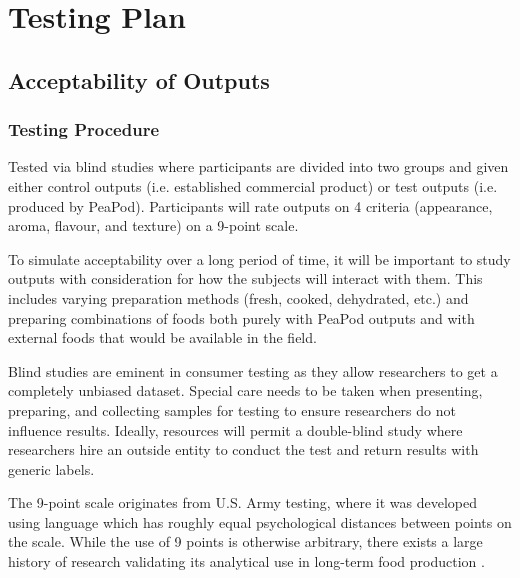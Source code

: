 \section{Testing Plan}

\subsection{Acceptability of Outputs}

\subsubsection{Testing Procedure}
Tested via blind studies where participants are divided into two groups and given either control outputs (i.e. established commercial product) or test outputs (i.e. produced by PeaPod). Participants will rate outputs on 4 criteria (appearance, aroma, flavour, and texture) on a 9-point scale.

To simulate acceptability over a long period of time, it will be important to study outputs with consideration for how the subjects will interact with them. This includes varying preparation methods (fresh, cooked, dehydrated, etc.) and preparing combinations of foods both purely with PeaPod outputs and with external foods that would be available in the field.

Blind studies are eminent in consumer testing as they allow researchers to get a completely unbiased dataset. Special care needs to be taken when presenting, preparing, and collecting samples for testing to ensure researchers do not influence results. Ideally, resources will permit a double-blind study where researchers hire an outside entity to conduct the test and return results with generic labels.

The 9-point scale originates from U.S. Army testing, where it was developed using language which has roughly equal psychological distances between points on the scale. While the use of 9 points is otherwise arbitrary, there exists a large history of research validating its analytical use in long-term food production \cite{hedonic}.

